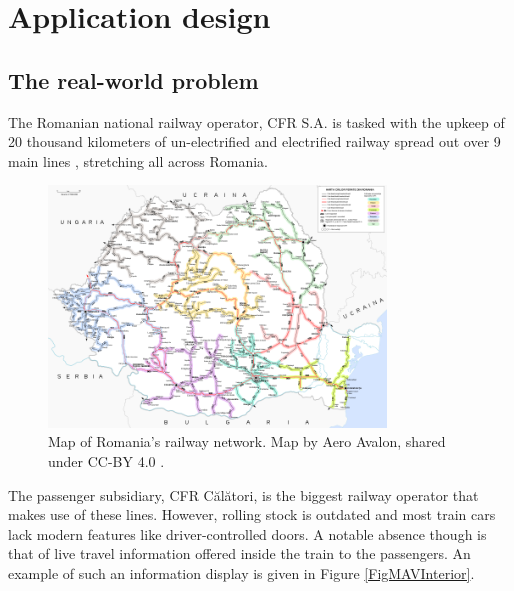 \chapter{Application design}

\section{The real-world problem}
The Romanian national railway operator, CFR S.A. is tasked with the upkeep of 20 thousand kilometers of un-electrified and electrified railway spread out over 9 main lines \cite{CFROrdinMagistrale} \cite{WallstreetRoReorganizareSNCFR}, stretching all across Romania.

\begin{figure}[htbp]
    \centering
    \includegraphics[width=0.8\textwidth]{./figures/ch3_romania-feroviara.png}
    \caption{Map of Romania's railway network. Map by Aero Avalon, shared under CC-BY 4.0 \cite{WikipediaRomaniaFeroviara}.}
    \label{FigRomaniaFeroviara}
\end{figure}

The passenger subsidiary, CFR Călători, is the biggest railway operator that makes use of these lines. However, rolling stock is outdated and most train cars lack modern features like driver-controlled doors. A notable absence though is that of live travel information offered inside the train to the passengers. An example of such an information display is given in Figure \ref{FigMAVInterior}.

